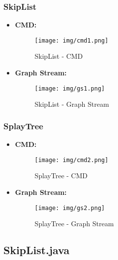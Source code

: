 \documentclass{article}
\begin{document}
  \subsubsection{SkipList}
  \begin{itemize}
    \item \textbf{CMD: }
    \begin{figure}[H]
      \centering
      \texttt{[image: img/cmd1.png]}
      \caption{SkipList - CMD}
    \end{figure}
    \item \textbf{Graph Stream: }
    \begin{figure}[H]
      \centering
      \texttt{[image: img/gs1.png]}
      \caption{SkipList - Graph Stream}
    \end{figure}
  \end{itemize}
  

  \subsubsection{SplayTree}
  \begin{itemize}
    \item \textbf{CMD: }
    \begin{figure}[H]
      \centering
      \texttt{[image: img/cmd2.png]}
      \caption{SplayTree - CMD}
    \end{figure}
    \item \textbf{Graph Stream: }
    \begin{figure}[H]
      \centering
      \texttt{[image: img/gs2.png]}
      \caption{SplayTree - Graph Stream}
    \end{figure}
  \end{itemize}
  

  \subsection{SkipList.java}
  
\end{document}
